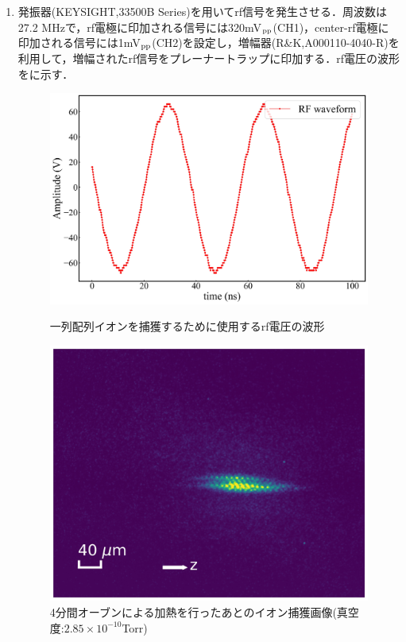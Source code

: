 \begin{enumerate}
\begin{enumerate}
\item 発振器(KEYSIGHT,33500B Series)を用いてrf信号を発生させる．周波数は27.2 MHzで，rf電極に印加される信号には320mV$_{\rm pp}$(CH1)，center-rf電極に印加される信号には1mV$_{\rm pp}$(CH2)を設定し，増幅器(R\&K,A000110-4040-R)を利用して，増幅されたrf信号をプレーナートラップに印加する．rf電圧の波形をに示す．

\begin{figure}[h]
	\begin{minipage}{0.48\linewidth}
		\begin{center}
			\includegraphics[width=0.9\columnwidth]{./methods/figure/1D_wave.jpg}
			\caption{一列配列イオンを捕獲するために使用するrf電圧の波形}
			\label{fig:1D_wave}
		\end{center}
	\end{minipage}
	\begin{minipage}{0.48\linewidth}
		\begin{center}
			\includegraphics[width=0.6\columnwidth]{./methods/figure/string.jpg}
			\caption{4分間オーブンによる加熱を行ったあとのイオン捕獲画像(真空度:$2.85 \times 10^{-10}$Torr)}
			\label{fig:Cap_string}
		\end{center}
	\end{minipage}
\end{figure}


\end{enumerate}
\end{enumerate}
